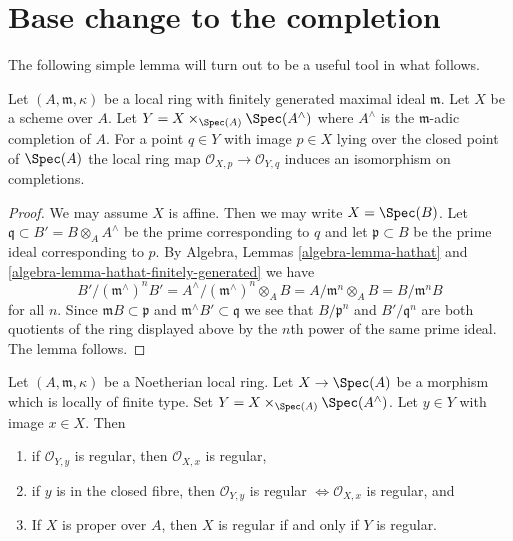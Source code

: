 \section{Base change to the completion}
\label{section-aux}

\noindent
The following simple lemma will turn out to be a useful tool in what follows.

\begin{lemma}
\label{lemma-iso-completions}
Let $(A, \mathfrak m, \kappa)$ be a local ring with finitely generated
maximal ideal $\mathfrak m$. Let $X$ be a scheme over $A$.
Let $Y = X \times_{\Spec(A)} \Spec(A^\wedge)$ where
$A^\wedge$ is the $\mathfrak m$-adic completion of $A$.
For a point $q \in Y$ with image $p \in X$ lying
over the closed point of $\Spec(A)$ the
local ring map $\mathcal{O}_{X, p} \to \mathcal{O}_{Y, q}$
induces an isomorphism on completions.
\end{lemma}

\begin{proof}
We may assume $X$ is affine. Then we may write $X = \Spec(B)$.
Let $\mathfrak q \subset B' = B \otimes_A A^\wedge$ be the
prime corresponding to $q$ and let $\mathfrak p \subset B$
be the prime ideal corresponding to $p$.
By Algebra, Lemmas \ref{algebra-lemma-hathat} and
\ref{algebra-lemma-hathat-finitely-generated}
we have
$$
B'/(\mathfrak m^\wedge)^n B' =
A^\wedge/(\mathfrak m^\wedge)^n \otimes_A B =
A/\mathfrak m^n \otimes_A B = B/\mathfrak m^n B
$$
for all $n$. Since $\mathfrak m B \subset \mathfrak p$ and
$\mathfrak m^\wedge B' \subset \mathfrak q$ we see that
$B/\mathfrak p^n$ and $B'/\mathfrak q^n$ are both
quotients of the ring displayed above by the $n$th power
of the same prime ideal. The lemma follows.
\end{proof}

\begin{lemma}
\label{lemma-port-regularity-to-completion}
Let $(A, \mathfrak m, \kappa)$ be a Noetherian local ring.
Let $X \to \Spec(A)$ be a morphism which is locally of finite type.
Set $Y = X \times_{\Spec(A)} \Spec(A^\wedge)$. Let $y \in Y$ with
image $x \in X$. Then
\begin{enumerate}
\item if $\mathcal{O}_{Y, y}$ is regular, then $\mathcal{O}_{X, x}$
is regular,
\item if $y$ is in the closed fibre, then $\mathcal{O}_{Y, y}$ is regular
$\Leftrightarrow \mathcal{O}_{X, x}$ is regular, and
\item If $X$ is proper over $A$, then $X$ is regular
if and only if $Y$ is regular.
\end{enumerate}
\end{lemma}

